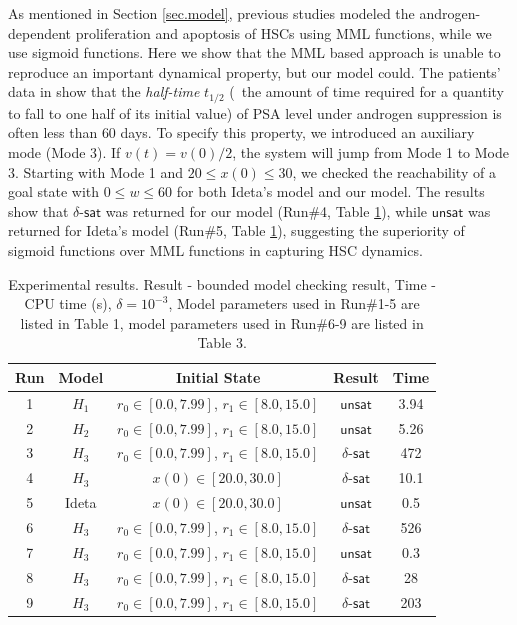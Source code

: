 As mentioned in Section \ref{sec.model}, previous studies \cite{jackson04a,jackson04b,ideta08} modeled the androgen-dependent proliferation and apoptosis of HSCs using MML functions, while we use sigmoid functions. Here we show that the MML based approach is unable to reproduce an important dynamical property, but our model could. The patients' data in \cite{ bruchovsky06,bruchovsky07} show that the \textit{half-time} $t_{1/2}$ (\ie~the amount of time required for a quantity to fall to one half of its initial value) of PSA level under androgen suppression is often less than $60$ days. To specify this property, we introduced an auxiliary mode (Mode 3). If $v(t)=v(0)/2$, the system will jump from Mode 1 to Mode 3. Starting with Mode 1 and $20 \le x(0) \le 30$, we checked the reachability of a goal state with $0 \le w \le 60$ for both Ideta's model \cite{ideta08} and our model. The results show that  $\delta$-$\mathsf{sat}$ was returned for our model (Run\#4, Table \ref{runs}), while $\mathsf{unsat}$ was returned for Ideta's model (Run\#5, Table \ref{runs}), suggesting the superiority of sigmoid functions over MML functions in capturing HSC dynamics.




\begin{table}[!th]
  \centering
  \small
  \begin{tabular}{|c|c|c|c|c|}
    \hline
    \hline
    Run & Model & Initial State   & Result   & Time   \\
    \hline
    \hline
    1 & $H_1$ & $r_0 \in [0.0,7.99]$, $r_1 \in [8.0,15.0]$  & $\mathsf{unsat}$  &  3.94 \\
    2 & $H_2$ & $r_0 \in [0.0,7.99]$, $r_1 \in [8.0,15.0]$   & $\mathsf{unsat}$  &  5.26 \\
    3 & $H_3$ & $r_0 \in [0.0,7.99]$, $r_1 \in [8.0,15.0]$   & $\delta$-$\mathsf{sat}$ &  472 \\ 
    4 & $H_3$ & $x(0) \in [20.0,30.0]$   & $\delta$-$\mathsf{sat}$ &  10.1 \\
    5 & Ideta & $x(0) \in [20.0,30.0]$   & $\mathsf{unsat}$ &  0.5 \\           
    6 & $H_3$ & $r_0 \in [0.0,7.99]$, $r_1 \in [8.0,15.0]$   & $\delta$-$\mathsf{sat}$ &  526 \\ 
    7 & $H_3$ & $r_0 \in [0.0,7.99]$, $r_1 \in [8.0,15.0]$   & $\mathsf{unsat}$ &  0.3 \\ 
    8 & $H_3$ & $r_0 \in [0.0,7.99]$, $r_1 \in [8.0,15.0]$   & $\delta$-$\mathsf{sat}$ &  28 \\ 
    9 & $H_3$ & $r_0 \in [0.0,7.99]$, $r_1 \in [8.0,15.0]$   & $\delta$-$\mathsf{sat}$ & 203 \\ 
    \hline
    \hline
  \end{tabular}
  \caption{\small
  Experimental results.
    Result - bounded model checking result,
    Time - CPU time (s),
    $\delta=10^{-3}$,
    Model parameters used in Run\#1-5 are listed in Table 1,  model parameters used in Run\#6-9 are listed in Table 3.
}\label{runs}
\end{table}


